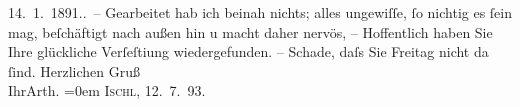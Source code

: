 \begin{ledgroupsized}[t]{13cm}
{{{                            14. 1. 1891.}}}\label{K_L00236_2h}. –\pend
           \pstart
           Gearbeitet hab ich beinah nichts; alles ungewiſſe, ſo nichtig es ſein mag,
                    beſchäftigt nach außen hin u macht daher nervös, – Hoffentlich haben {\pb}Sie Ihre glückliche Verſeſti{\geminationm}ung wiedergefunden. – Schade, daſs Sie Freitag
                    nicht da ſind.\pend
           \pstart
           Herzlichen Gruß{\\[\baselineskip]}Ihr\spacefill\mbox{Arth.}\pend
           \leftskip=0em{}\pstart
           \textsc{Ischl}, 12. 7. 93.\pend
                     \endnumbering{}\end{ledgroupsized}  \newcommand{\dateiname}{L00236}\newcommand{\titel}{Arthur Schnitzler an Hugo von Hofmannsthal, 12. 7. 1893}\newcommand{\editorInnen}{Martin Anton Müller und Gerd-Hermann Susen}
            \footnotesize
\begin{ledgroupsized}[t]{11.5cm}
\end{ledgroupsized}
         
      